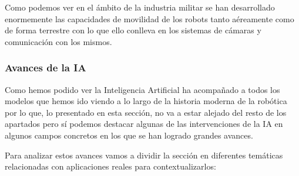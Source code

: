 Como podemos ver en el ámbito de la industria militar se han desarrollado enormemente las capacidades de movilidad de los robots tanto aéreamente como de forma terrestre con lo que ello conlleva en los sistemas de cámaras y comunicación con los mismos.

\subsubsection{Avances de la IA}
Como hemos podido ver la Inteligencia Artificial ha acompañado a todos los modelos que hemos ido viendo a lo largo de la historia moderna de la robótica por lo que, lo presentado en esta sección, no va a estar alejado del resto de los apartados pero sí podemos destacar algunas de las intervenciones de la IA en algunos campos concretos en los que se han logrado grandes avances.

Para analizar estos avances vamos a dividir la sección en diferentes temáticas relacionadas con aplicaciones reales para contextualizarlos:


